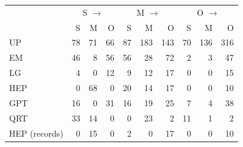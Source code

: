 \begin{tabular}{@{}lrrrrrrrrr@{}}\toprule
 & \multicolumn{3}{c}{S $\to$} & \multicolumn{3}{c}{M $\to$} & \multicolumn{3}{c}{O $\to$} \\
 & S & M & O & S & M & O & S & M & O \\\midrule
UP & 78 & 71 & 66 & 87 & 183 & 143 & 70 & 136 & 316 \\
EM & 46 & 8 & 56 & 56 & 28 & 72 & 2 & 3 & 47 \\
LG & 4 & 0 & 12 & 9 & 12 & 17 & 0 & 0 & 15 \\
HEP & 0 & 68 & 0 & 20 & 14 & 17 & 0 & 0 & 10 \\
GPT & 16 & 0 & 31 & 16 & 19 & 25 & 7 & 4 & 38 \\
QRT & 33 & 14 & 0 & 0 & 23 & 2 & 11 & 1 & 2 \\
HEP (records) & 0 & 15 & 0 & 2 & 0 & 17 & 0 & 0 & 10 \\
\bottomrule\end{tabular}
